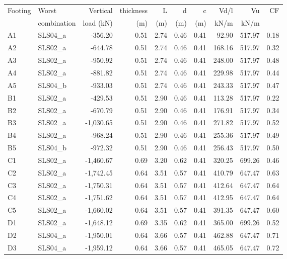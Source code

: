 \begin{table}
\begin{center}
  \begin{scriptsize}
  \begin{tabular}{|l|l|r|r|r|r|r|r|r|r|}
\hline
Footing & Worst & Vertical & thickness & L & d & c & Vd/l & Vu & CF\\
 & combination & load (kN) & (m) & (m) & (m) & (m) & kN/m & kN/m & \\
\hline
 A1 &  SLS04\_a & -356.20 & 0.51 & 2.74 & 0.46 & 0.41 & 92.90 & 517.97 & 0.18\\
 A2 &  SLS02\_a & -644.78 & 0.51 & 2.74 & 0.46 & 0.41 & 168.16 & 517.97 & 0.32\\
 A3 &  SLS02\_a & -950.92 & 0.51 & 2.74 & 0.46 & 0.41 & 248.00 & 517.97 & 0.48\\
 A4 &  SLS02\_a & -881.82 & 0.51 & 2.74 & 0.46 & 0.41 & 229.98 & 517.97 & 0.44\\
 A5 &  SLS04\_b & -933.03 & 0.51 & 2.74 & 0.46 & 0.41 & 243.33 & 517.97 & 0.47\\
 B1 &  SLS02\_a & -429.53 & 0.51 & 2.90 & 0.46 & 0.41 & 113.28 & 517.97 & 0.22\\
 B2 &  SLS02\_a & -670.79 & 0.51 & 2.90 & 0.46 & 0.41 & 176.91 & 517.97 & 0.34\\
 B3 &  SLS02\_a & -1,030.65 & 0.51 & 2.90 & 0.46 & 0.41 & 271.82 & 517.97 & 0.52\\
 B4 &  SLS02\_a & -968.24 & 0.51 & 2.90 & 0.46 & 0.41 & 255.36 & 517.97 & 0.49\\
 B5 &  SLS04\_b & -972.32 & 0.51 & 2.90 & 0.46 & 0.41 & 256.43 & 517.97 & 0.50\\
 C1 &  SLS02\_a & -1,460.67 & 0.69 & 3.20 & 0.62 & 0.41 & 320.25 & 699.26 & 0.46\\
 C2 &  SLS02\_a & -1,742.45 & 0.64 & 3.51 & 0.57 & 0.41 & 410.79 & 647.47 & 0.63\\
 C3 &  SLS02\_a & -1,750.31 & 0.64 & 3.51 & 0.57 & 0.41 & 412.64 & 647.47 & 0.64\\
 C4 &  SLS02\_a & -1,751.62 & 0.64 & 3.51 & 0.57 & 0.41 & 412.95 & 647.47 & 0.64\\
 C5 &  SLS02\_a & -1,660.02 & 0.64 & 3.51 & 0.57 & 0.41 & 391.35 & 647.47 & 0.60\\
 D1 &  SLS02\_a & -1,648.12 & 0.69 & 3.35 & 0.62 & 0.41 & 365.00 & 699.26 & 0.52\\
 D2 &  SLS04\_a & -1,950.01 & 0.64 & 3.66 & 0.57 & 0.41 & 462.88 & 647.47 & 0.71\\
 D3 &  SLS04\_a & -1,959.12 & 0.64 & 3.66 & 0.57 & 0.41 & 465.05 & 647.47 & 0.72\\

\end{tabular}
\end{scriptsize}
\end{center}
\end{table}
